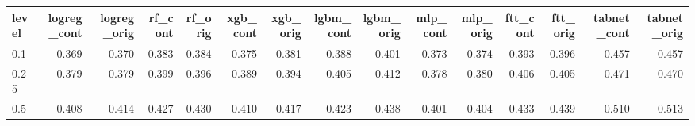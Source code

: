 \begin{tabular}{lrrrrrrrrrrrrrr}
\toprule
level & logreg\_cont & logreg\_orig & rf\_cont & rf\_orig & xgb\_cont & xgb\_orig & lgbm\_cont & lgbm\_orig & mlp\_cont & mlp\_orig & ftt\_cont & ftt\_orig & tabnet\_cont & tabnet\_orig \\
\midrule
0.1 & 0.369 & 0.370 & 0.383 & 0.384 & 0.375 & 0.381 & 0.388 & 0.401 & 0.373 & 0.374 & 0.393 & 0.396 & 0.457 & 0.457 \\
0.25 & 0.379 & 0.379 & 0.399 & 0.396 & 0.389 & 0.394 & 0.405 & 0.412 & 0.378 & 0.380 & 0.406 & 0.405 & 0.471 & 0.470 \\
0.5 & 0.408 & 0.414 & 0.427 & 0.430 & 0.410 & 0.417 & 0.423 & 0.438 & 0.401 & 0.404 & 0.433 & 0.439 & 0.510 & 0.513 \\
\bottomrule
\end{tabular}
